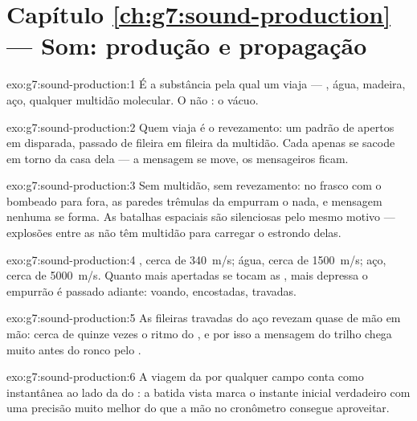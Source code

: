 \section*{Capítulo \ref{ch:g7:sound-production} --- Som: produção e propagação}

\begin{solution}{exo:g7:sound-production:1}
É a substância pela qual um  viaja --- , água, madeira, aço,
qualquer multidão molecular. O não : o vácuo.
\end{solution}

\begin{solution}{exo:g7:sound-production:2}
Quem viaja é o revezamento: um padrão de apertos em disparada,
passado de fileira em fileira da multidão. Cada  apenas se
sacode em torno da casa dela --- a mensagem se move, os mensageiros
ficam.
\end{solution}

\begin{solution}{exo:g7:sound-production:3}
Sem multidão, sem revezamento: no frasco com o  bombeado para fora,
as paredes trêmulas da  empurram o nada, e mensagem nenhuma
se forma. As batalhas espaciais são silenciosas pelo mesmo motivo ---
explosões entre as  não têm multidão para carregar o estrondo
delas.
\end{solution}

\begin{solution}{exo:g7:sound-production:4}
, cerca de \qty{340}{m/s}; água, cerca de \qty{1500}{m/s}; aço,
cerca de \qty{5000}{m/s}. Quanto mais apertadas se tocam as
, mais depressa o empurrão é passado adiante: voando,
encostadas, travadas.
\end{solution}

\begin{solution}{exo:g7:sound-production:5}
As fileiras travadas do aço revezam quase de mão em mão: cerca de
quinze vezes o ritmo do , e por isso a mensagem do trilho chega
muito antes do ronco pelo .
\end{solution}

\begin{solution}{exo:g7:sound-production:6}
A viagem da  por qualquer campo conta como instantânea ao lado da
do : a batida vista marca o instante inicial verdadeiro com uma
precisão muito melhor do que a mão no cronômetro consegue aproveitar.
\end{solution}

